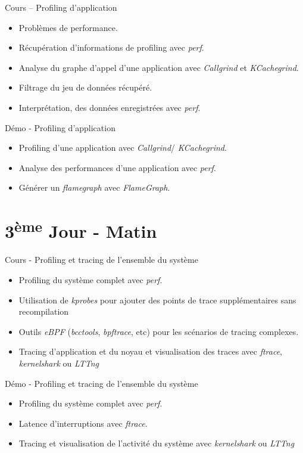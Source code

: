 \documentclass[a4paper,12pt,obeyspaces,spaces,hyphens]{article}
\begin{document}
\feagendatwocolumn
{Cours – Profiling d'application}
{
  \begin{itemize}
  \item Problèmes de performance.
  \item Récupération d'informations de profiling avec {\em perf}.
  \item Analyse du graphe d'appel d'une application avec {\em
      Callgrind} et {\em KCachegrind}.
  \item Filtrage du jeu de données récupéré.
  \item Interprétation, des données enregistrées avec {\em perf}.
  \end{itemize}
}
{Démo - Profiling d'application}
{
  \begin{itemize}
  \item Profiling d'une application avec {\em Callgrind}/{\em
      KCachegrind}.
  \item Analyse des performances d'une application avec {\em perf}.
  \item Générer un {\em flamegraph} avec {\em FlameGraph}.
  \end{itemize}
}

\section{3\textsuperscript{ème} Jour - Matin}

\feagendatwocolumn
{Cours - Profiling et tracing de l'ensemble du système}
{
  \begin{itemize}
  \item Profiling du système complet avec {\em perf}.
  \item Utilisation de {\em kprobes} pour ajouter des points de trace
    supplémentaires sans recompilation
  \item Outils {\em eBPF} ({\em bcctools}, {\em bpftrace}, etc) pour
    les scénarios de tracing complexes.
  \item Tracing d'application et du noyau et visualisation des traces
    avec {\em ftrace}, {\em kernelshark} ou {\em LTTng}
  \end{itemize}
}
{Démo - Profiling et tracing de l'ensemble du système}
{
  \begin{itemize}
  \item Profiling du système complet avec {\em perf}.
  \item Latence d'interruptions avec {\em ftrace}.
  \item Tracing et visualisation de l'activité du système avec {\em
      kernelshark} ou {\em LTTng}
  \end{itemize}
}
\end{document}
